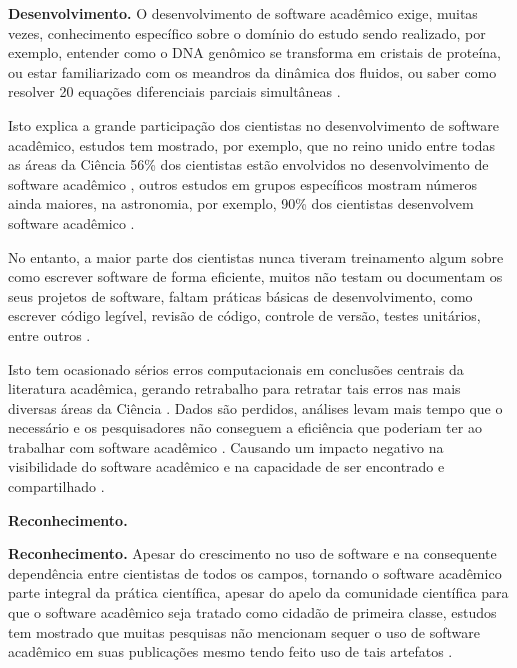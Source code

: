 \begin{description}
\item \textbf{Desenvolvimento.}
O desenvolvimento de software acadêmico exige, muitas vezes, conhecimento
específico sobre o domínio do estudo sendo realizado,
por exemplo, entender como o DNA genômico
se transforma em cristais de proteína, ou estar familiarizado com os meandros
da dinâmica dos fluidos, ou saber como resolver 20 equações diferenciais
parciais simultâneas \cite{segal2008developing}.

Isto explica a grande participação dos cientistas no desenvolvimento de
software acadêmico, estudos tem mostrado, por exemplo, que no reino unido entre todas as
áreas da Ciência 56\% dos cientistas estão envolvidos no desenvolvimento de
software acadêmico \cite{hettrick2014uk}, outros estudos em grupos específicos mostram números ainda
maiores, na astronomia, por exemplo, 90\% dos cientistas desenvolvem software
acadêmico \cite{momcheva2015software}.

No entanto, a maior parte dos cientistas nunca tiveram treinamento algum sobre como escrever
software de forma eficiente, muitos não testam ou documentam os seus projetos de
software, faltam práticas básicas de desenvolvimento, como escrever código
legível, revisão de código, controle de versão, testes unitários, entre outros
\cite{wilson2017good}.

Isto tem ocasionado sérios erros computacionais em conclusões centrais da
literatura acadêmica, gerando retrabalho para retratar tais erros nas mais
diversas áreas da Ciência \cite{merali2010computational}.
Dados são perdidos, análises levam mais tempo que o necessário e os
pesquisadores não conseguem a eficiência que poderiam ter ao trabalhar com
software acadêmico \cite{wilson2017good}.
Causando um impacto negativo na visibilidade do software acadêmico e na
capacidade de ser encontrado e compartilhado \cite{howison2013incentives,
katz2014transitive}.

\item \textbf{Reconhecimento.}

\noindent \textbf{Reconhecimento.}
Apesar do crescimento no uso de software e na consequente dependência entre
cientistas de todos os campos, tornando o software acadêmico parte integral da
prática científica, apesar do apelo da comunidade científica para que o
software acadêmico seja tratado como cidadão de primeira classe, estudos tem
mostrado que muitas pesquisas não mencionam sequer o uso de software acadêmico
em suas publicações mesmo tendo feito uso de tais artefatos
\cite{momcheva2015software, howison2016software}.


\end{description}
